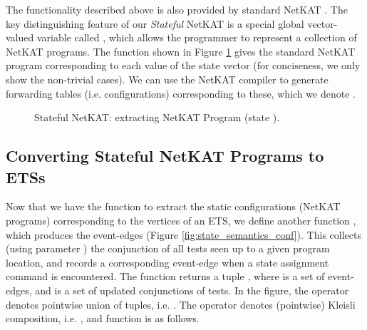 \documentclass[pldi-cameraready]{sigplanconf}
\begin{document}
\noindent
The functionality described above is also provided by standard NetKAT \cite{smolka2015}.
The key distinguishing feature of our {\em Stateful} NetKAT is a special
global vector-valued variable called , which allows the
programmer to represent a collection of NetKAT programs. The function
shown in Figure \ref{fig:state_static_semantics} gives the standard
NetKAT program  corresponding to
each value  of the state vector (for conciseness, we only
show the non-trivial cases).  We can use the NetKAT compiler
\cite{smolka2015} to generate forwarding tables (i.e. configurations)
corresponding to these, which we denote .

\begin{figure}[t]
\footnotesize

\caption{Stateful NetKAT: extracting NetKAT Program (state ).}
\label{fig:state_static_semantics}
\end{figure}




\begin{figure*}[t]
\small
\centering
{}
\caption{Stateful NetKAT: extracting event-edges from state .}
\label{fig:state_semantics_conf}
\end{figure*}


\subsection{Converting Stateful NetKAT Programs to ETSs}

Now that we have the  function 
to extract the static configurations (NetKAT programs) corresponding to the vertices of an ETS,
we define another function ,
which produces the event-edges
(Figure \ref{fig:state_semantics_conf}).
This collects (using parameter ) the conjunction of all tests seen up to
a given program location, and records a corresponding event-edge when a state assignment
command is encountered.
The function returns a tuple , where  is a set of event-edges, and 
is a set of updated conjunctions of tests.
In the figure, the  operator denotes pointwise union of tuples,
i.e. .
The  operator denotes (pointwise) Kleisli composition, i.e. 
, and function  is as follows.
\end{document}
